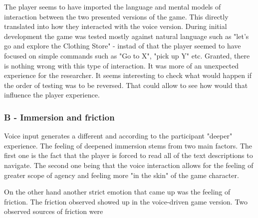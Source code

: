 
The player seems to have imported the language and mental models of interaction between the two presented versions of the game. This directly translated into how they interacted with the voice version. During initial development the game was tested mostly against natural language such as
"let's go and explore the Clothing Store" - instad of that the player seemed to have focused on simple commands such as "Go to X", "pick up Y" etc.
Granted, there is nothing wrong with this type of interaction. It was more of an unexpected experience for the researcher. It seems interesting to check what would happen if the order of testing was to be reversed. That could allow to see how would that influence the player experience.


\subsubsection{B - Immersion and friction}


Voice input generates a different and according to the participant "deeper" experience. The feeling of deepened immersion stems from two main factors. The first one is the fact that the player is forced to read all of the text descriptions to navigate. The second one being that the voice interaction allows for the feeling of greater scope of agency and feeling more "in the skin" of the game character. 

On the other hand another strict emotion that came up was the feeling of friction. The friction observed showed up in the voice-driven game version. Two observed sources of friction were 

